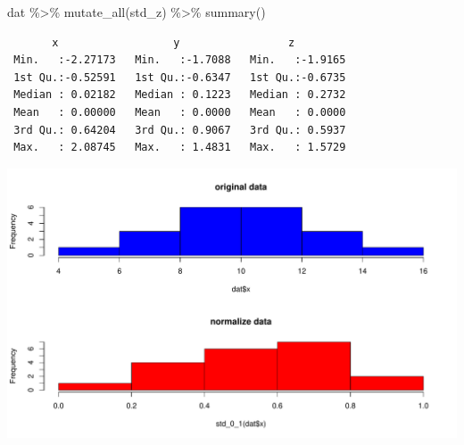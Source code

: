 \documentclass[
  letterpaper,
  DIV=11,
  numbers=noendperiod]{scrreprt}
\newenvironment{Shaded}{\begin{snugshade}}{\end{snugshade}}
\newcommand{\AttributeTok}[1]{\textcolor[rgb]{0.40,0.45,0.13}{#1}}
\newcommand{\CommentTok}[1]{\textcolor[rgb]{0.37,0.37,0.37}{#1}}
\newcommand{\DecValTok}[1]{\textcolor[rgb]{0.68,0.00,0.00}{#1}}
\newcommand{\FunctionTok}[1]{\textcolor[rgb]{0.28,0.35,0.67}{#1}}
\newcommand{\NormalTok}[1]{\textcolor[rgb]{0.00,0.23,0.31}{#1}}
\newcommand{\SpecialCharTok}[1]{\textcolor[rgb]{0.37,0.37,0.37}{#1}}
\newcommand{\StringTok}[1]{\textcolor[rgb]{0.13,0.47,0.30}{#1}}
\begin{document}
\begin{Shaded}
\begin{Highlighting}[]
\NormalTok{dat }\SpecialCharTok{\%\textgreater{}\%} \FunctionTok{mutate\_all}\NormalTok{(std\_z) }\SpecialCharTok{\%\textgreater{}\%} \FunctionTok{summary}\NormalTok{()}
\end{Highlighting}
\end{Shaded}

\begin{verbatim}
       x                  y                 z          
 Min.   :-2.27173   Min.   :-1.7088   Min.   :-1.9165  
 1st Qu.:-0.52591   1st Qu.:-0.6347   1st Qu.:-0.6735  
 Median : 0.02182   Median : 0.1223   Median : 0.2732  
 Mean   : 0.00000   Mean   : 0.0000   Mean   : 0.0000  
 3rd Qu.: 0.64204   3rd Qu.: 0.9067   3rd Qu.: 0.5937  
 Max.   : 2.08745   Max.   : 1.4831   Max.   : 1.5729  
\end{verbatim}

\begin{Shaded}
\end{Shaded}

\includegraphics{data_preprocess_files/figure-pdf/unnamed-chunk-16-1.pdf}
\end{document}
